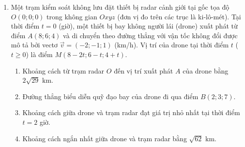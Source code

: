 \documentclass[12pt,a4paper]{article}
\begin{document}
\begin{enumerate}[label=\textbf{Câu \arabic*:}, leftmargin=*]
\item \begin{minipage}[t]{0.55\linewidth}
Một trạm kiểm soát không lưu đặt thiết bị radar cảnh giới tại gốc tọa độ $O(0; 0; 0)$ trong không gian $Oxyz$ (đơn vị đo trên các trục là ki-lô-mét). Tại thời điểm $t = 0$ (giờ), một thiết bị bay không người lái (drone) xuất phát từ điểm $A(8; 6; 4)$ và di chuyển theo đường thẳng với vận tốc không đổi được mô tả bởi vectơ $\vec{v} = (-2; -1; 1)$ (km/h). Vị trí của drone tại thời điểm $t$ ($t \ge 0$) là điểm $M(8 - 2t; 6 - t; 4 + t)$.
\begin{enumerate}[label=\textbf{\alph*)}]
    \item Khoảng cách từ trạm radar $O$ đến vị trí xuất phát $A$ của drone bằng $2\sqrt{29}\text{ km}$.
    \item Đường thẳng biểu diễn quỹ đạo bay của drone đi qua điểm $B(2; 3; 7)$.
    \item Khoảng cách giữa drone và trạm radar đạt giá trị nhỏ nhất tại thời điểm $t = 2$ giờ.
    \item Khoảng cách ngắn nhất giữa drone và trạm radar bằng $\sqrt{62}\text{ km}$.
\end{enumerate}
\end{minipage}\hfill
\begin{minipage}[t]{0.42\linewidth}
\vspace{-0.4\baselineskip}
\centering
{}
\end{minipage}
\end{enumerate}
\end{document}
